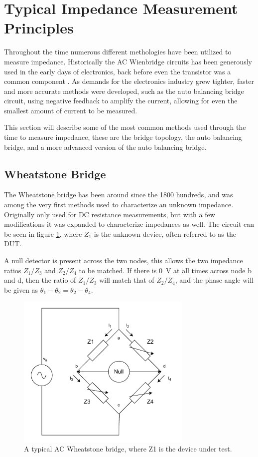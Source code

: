 \section{Typical Impedance Measurement Principles} \label{sec:TypicalMeasPrin}
Throughout the time numerous different methologies have been utilized to measure impedance. Historically the AC Wienbridge circuits has been generously used in the 
early days of electronics, back before even the transistor was a common component \cite{IET_LABS_LCR_PRINCIPLES}. As demands for the electronics industry grew tighter,
faster and more accurate methods were developed, such as the auto balancing bridge circuit, using negative feedback to amplify the current, allowing for even the
smallest amount of current to be measured.

This section will describe some of the most common methods used through the time to measure impedance, these are the bridge topology, the auto balancing bridge, and a more advanced version of the auto balancing bridge. 

\subsection{Wheatstone Bridge}
The Wheatstone bridge has been around since the 1800 hundreds, and was among the very first methods used to characterize an unknown impedance. Originally only used for DC resistance measurements, but with a few modifications it was expanded to characterize impedances as well. 
The circuit can be seen in figure \ref{fig_4_2_WheatstoneBridge}, where $Z_1$ is the unknown device,
 often referred to as the DUT.
 
A null detector is present across the two nodes, this allows the two impedance ratios $Z_1/Z_3$ and $Z_2/Z_4$
to be matched. If there is \SI{0}{\volt} at all times across node b and d, then the ratio of $Z_1/Z_3$ will match that of
 $Z_2/Z_4$, and the
phase angle will be given as $\theta_1 - \theta_2 = \theta_2 - \theta_4$. 

\begin{figure}[H]
    \centering
    \includegraphics[width=0.75\textwidth]{Sections/4_TechnicalAnalysis/Figures_JFT/WheatstoneBridgeAC.pdf}
    \caption{A typical AC Wheatstone bridge, where Z1 is the device under test.}
    \label{fig_4_2_WheatstoneBridge}
\end{figure}

